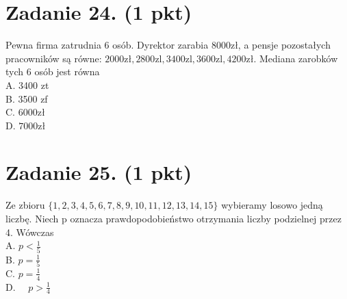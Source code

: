 \documentclass[10pt]{article}
\begin{document}
\section*{Zadanie 24. (1 pkt)}
Pewna firma zatrudnia 6 osób. Dyrektor zarabia \(8000 \mathrm{zł}\), a pensje pozostałych pracowników są równe: \(2000 \mathrm{zł}, 2800 \mathrm{zl}, 3400 \mathrm{zl}, 3600 \mathrm{zl}, 4200 \mathrm{zł}\). Mediana zarobków tych 6 osób jest równa\\
A. 3400 zt\\
B. 3500 zf\\
C. \(6000 \mathrm{zł}\)\\
D. \(7000 \mathrm{zł}\)

\section*{Zadanie 25. (1 pkt)}
Ze zbioru \(\{1,2,3,4,5,6,7,8,9,10,11,12,13,14,15\}\) wybieramy losowo jedną liczbę. Niech p oznacza prawdopodobieństwo otrzymania liczby podzielnej przez 4. Wówczas\\
A. \(p<\frac{1}{5}\)\\
B. \(p=\frac{1}{5}\)\\
C. \(p=\frac{1}{4}\)\\
D. \(\quad p>\frac{1}{4}\)
\end{document}
